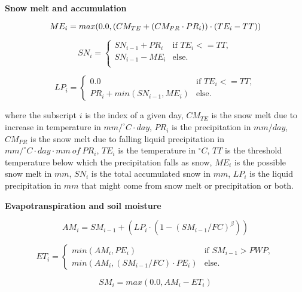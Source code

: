 \begin{fleqn}
\bigskip
\textbf{Snow melt and accumulation}

\begin{equation}
ME_i = max(0.0, (CM_{TE} + (CM_{PR} \cdot PR_i)) \cdot (TE_i - TT)) \\
\end{equation}

\begin{equation}
SN_{i} = 
\begin{cases}
SN_{i-1} + PR_i & \text{if } TE_i <= TT, \\
SN_{i-1} - ME_i & \text{else}. \\
\end{cases}
\end{equation}

\begin{equation}
LP_i = 
\begin{cases}
0.0 & \text{if } TE_i <= TT, \\
PR_i + min(SN_{i-1}, ME_i) & \text{else}.
\end{cases}
\end{equation}

where the subscript $i$ is the index of a given day, $CM_{TE}$ is the snow melt due to increase in temperature in $mm/^\circ C\cdot day$, $PR_i$ is the precipitation in $mm/day$, $CM_{PR}$ is the snow melt due to falling liquid precipitation in $mm/^\circ C\cdot day\cdot mm\ of\ PR_i$, $TE_i$ is the temperature in $^\circ C$, $TT$ is the threshold temperature below which the precipitation falls as snow, $ME_i$ is the possible snow melt in $mm$, $SN_i$ is the total accumulated snow in $mm$, $LP_i$ is the liquid precipitation in $mm$ that might come from snow melt or precipitation or both.

\bigskip
\textbf{Evapotranspiration and soil moisture}

\begin{equation}
AM_i = SM_{i-1} + (LP_i \cdot (1 - (SM_{i-1} / FC)^{\beta}))
\end{equation}

\begin{equation}
ET_i =
\begin{cases}
min(AM_i, PE_i) & \text{if } SM_{i-1} > PWP, \\
min(AM_i, (SM_{i-1} / FC) \cdot PE_i) & \text{else}.
\end{cases}
\end{equation}

\begin{equation}
SM_i = max(0.0, AM_i - ET_i)
\end{equation}


\end{fleqn}
